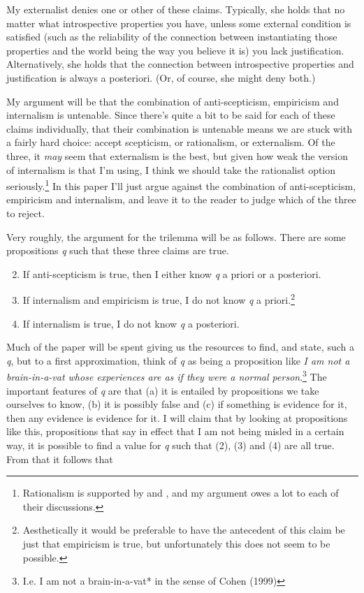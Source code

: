 My externalist denies one or other of these claims. Typically, she holds
that no matter what introspective properties you have, unless some
external condition is satisfied (such as the reliability of the
connection between instantiating those properties and the world being
the way you believe it is) you lack justification. Alternatively, she
holds that the connection between introspective properties and
justification is always a posteriori. (Or, of course, she might deny
both.)

My argument will be that the combination of anti-scepticism, empiricism
and internalism is untenable. Since there's quite a bit to be said for
each of these claims individually, that their combination is untenable
means we are stuck with a fairly hard choice: accept scepticism, or
rationalism, or externalism. Of the three, it \emph{may} seem that
externalism is the best, but given how weak the version of internalism
is that I'm using, I think we should take the rationalist option
seriously.\footnote{Rationalism is supported by \citet{Bonjour1997} and
  \citet{Hawthorne2002}, and my argument owes a lot to each of their
  discussions.} In this paper I'll just argue against the combination of
anti-scepticism, empiricism and internalism, and leave it to the reader
to judge which of the three to reject.

Very roughly, the argument for the trilemma will be as follows. There
are some propositions \emph{q} such that these three claims are true.

\begin{enumerate}
\setcounter{enumi}{1}
\item
  If anti-scepticism is true, then I either know \emph{q} a priori or a
  posteriori.
\item
  If internalism and empiricism is true, I do not know \emph{q} a
  priori.\footnote{Aesthetically it would be preferable to have the
    antecedent of this claim be just that empiricism is true, but
    unfortunately this does not seem to be possible.}
\item
  If internalism is true, I do not know \emph{q} a posteriori.
\end{enumerate}

Much of the paper will be spent giving us the resources to find, and
state, such a \emph{q}, but to a first approximation, think of \emph{q}
as being a proposition like \emph{I am not a brain-in-a-vat whose
experiences are as if they were a normal person}.\footnote{I.e. I am not
  a brain-in-a-vat* in the sense of Cohen (1999)} The important features
of \emph{q} are that (a) it is entailed by propositions we take
ourselves to know, (b) it is possibly false and (c) if something is
evidence for it, then any evidence is evidence for it. I will claim that
by looking at propositions like this, propositions that say in effect
that I am not being misled in a certain way, it is possible to find a
value for \emph{q} such that (2), (3) and (4) are all true. From that it
follows that

